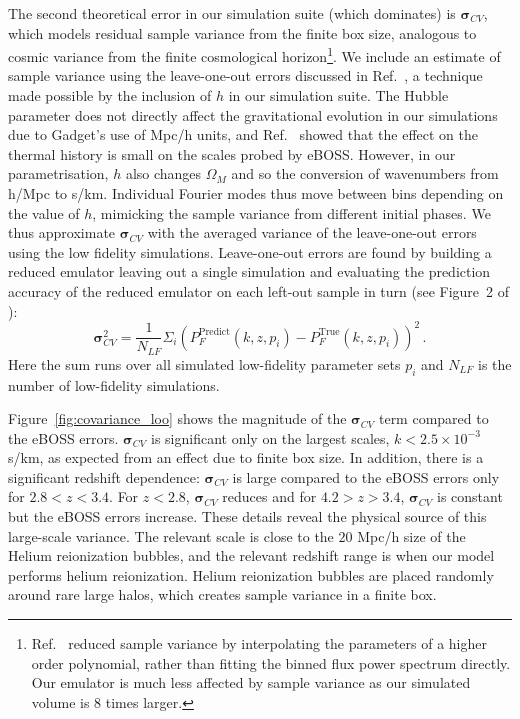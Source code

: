 The second theoretical error in our simulation suite (which dominates) is $\boldsymbol{\sigma}_{CV}$, which models residual sample variance from the finite box size, analogous to cosmic variance from the finite cosmological horizon\footnote{Ref.~\cite{2023ApJ...944..223P} reduced sample variance by interpolating the parameters of a higher order polynomial, rather than fitting the binned flux power spectrum directly.
Our emulator is much less affected by sample variance as our simulated volume is $8$ times larger.}. We include an estimate of sample variance using the leave-one-out errors discussed in Ref.~\cite{2023simsuite}, a technique made possible by the inclusion of $h$ in our simulation suite. The Hubble parameter does not directly affect the gravitational evolution in our simulations due to Gadget's use of Mpc/h units, and Ref.~\cite{2023simsuite} showed that the effect on the thermal history is small on the scales probed by eBOSS. However, in our parametrisation, $h$ also changes $\Omega_M$ and so the conversion of wavenumbers from h/Mpc to s/km. Individual Fourier modes thus move between bins depending on the value of $h$, mimicking the sample variance from different initial phases. We thus approximate $\boldsymbol{\sigma}_{CV}$ with the averaged variance of the leave-one-out errors using the low fidelity simulations. Leave-one-out errors are found by building a reduced emulator leaving out a single simulation and evaluating the prediction accuracy of the reduced emulator on each left-out sample in turn (see Figure~2 of \cite{2023simsuite}):
\begin{equation}
    \boldsymbol{\sigma}^2_{CV}  = \frac{1}{N_{LF}}\Sigma_i \left(P_F^\mathrm{Predict}(k, z, p_i) - P_F^\mathrm{True}(k, z, p_i)\right)^2\,.
\end{equation}
Here the sum runs over all simulated low-fidelity parameter sets $p_i$ and $N_{LF}$ is the number of low-fidelity simulations. 

Figure~\ref{fig:covariance_loo} shows the magnitude of the $\boldsymbol{\sigma}_{CV}$ term compared to the eBOSS errors.  $\boldsymbol{\sigma}_{CV}$ is significant only on the largest scales, $k < 2.5 \times 10^{-3}$ s/km, as expected from an effect due to finite box size. In addition, there is a significant redshift dependence: $\boldsymbol{\sigma}_{CV}$ is large compared to the eBOSS errors only for $2.8 < z < 3.4$. For $z < 2.8$, $\boldsymbol{\sigma}_{CV}$ reduces and for $4.2 > z>3.4$, $\boldsymbol{\sigma}_{CV}$ is constant but the eBOSS errors increase. These details reveal the physical source of this large-scale variance. The relevant scale is close to the $20$ Mpc/h size of the Helium reionization bubbles, and the relevant redshift range is when our model performs helium reionization. Helium reionization bubbles are placed randomly around rare large halos, which creates sample variance in a finite box.

